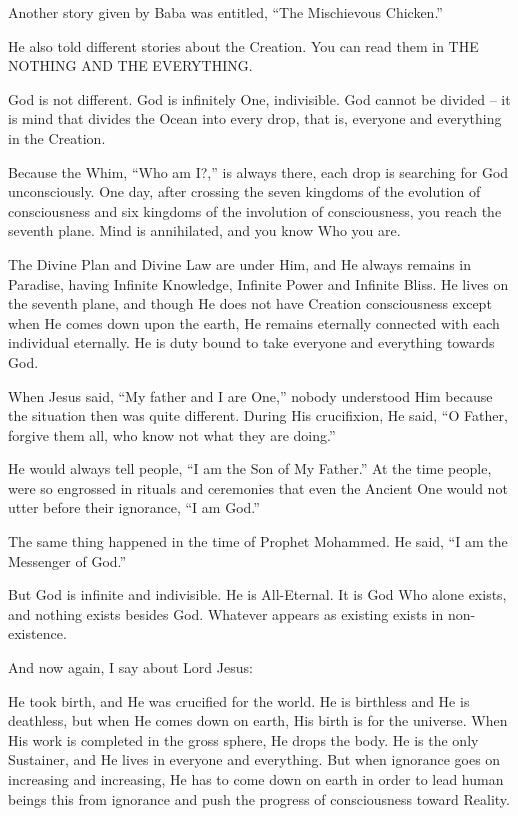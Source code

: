 Another story given by Baba was entitled, ``The Mischievous Chicken.''

He also told different stories about the Creation. You can read them in THE NOTHING AND THE EVERYTHING.

God is not different. God is infinitely One, indivisible. God cannot be divided -- it is mind that divides the Ocean into every drop, that is, everyone and everything in the Creation.

Because the Whim, ``Who am I?,'' is always there, each drop is searching for God unconsciously. One day, after crossing the seven kingdoms of the evolution of consciousness and six kingdoms of the involution of consciousness, you reach the seventh plane. Mind is annihilated, and you know Who you are.

The Divine Plan and Divine Law are under Him, and He always remains in Paradise, having Infinite Knowledge, Infinite Power and Infinite Bliss. He lives on the seventh plane, and though He does not have Creation consciousness except when He comes down upon the earth, He remains eternally connected with each individual eternally. He is duty bound to take everyone and everything towards God.

When Jesus said, ``My father and I are One,'' nobody understood Him because the situation then was quite different. During His crucifixion, He said, ``O Father, forgive them all, who know not what they are doing.''

He would always tell people, ``I am the Son of My Father.'' At the time people, were so engrossed in rituals and ceremonies that even the Ancient One would not utter before their ignorance, ``I am God.''

The same thing happened in the time of Prophet Mohammed. He said, ``I am the Messenger of God.''

But God is infinite and indivisible. He is All-Eternal. It is God Who alone exists, and nothing exists besides God. Whatever appears as existing exists in non-existence.

And now again, I say about Lord Jesus:

He took birth, and He was crucified for the world. He is birthless and He is deathless, but when He comes down on earth, His birth is for the universe. When His work is completed in the gross sphere, He drops the body. He is the only Sustainer, and He lives in everyone and everything. But when ignorance goes on increasing and increasing, He has to come down on earth in order to lead human beings this from ignorance and push the progress of consciousness toward Reality.

